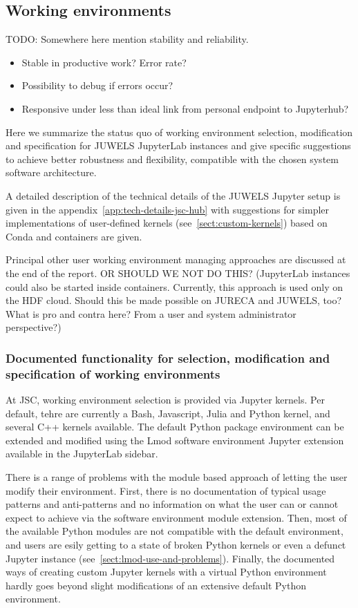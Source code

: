 
\subsection{Working environments}

TODO: Somewhere here mention stability and reliability.
\begin{itemize}
	\item Stable in productive work? Error rate?
  \item Possibility to debug if errors occur?
  \item Responsive under less than ideal link from personal endpoint to Jupyterhub?
\end{itemize}

Here we summarize the status quo of working environment selection, modification and specification for JUWELS JupyterLab instances and give specific suggestions to achieve better robustness and flexibility, compatible with the chosen system software architecture.

A detailed description of the technical details of the JUWELS Jupyter setup is given in the appendix~\ref{app:tech-details-jsc-hub} with suggestions for simpler implementations of user-defined kernels (see~\ref{sect:custom-kernels}) based on Conda and containers are given.

Principal other user working environment managing approaches are discussed at the end of the report. OR SHOULD WE NOT DO THIS? (JupyterLab instances could also be started inside containers. Currently, this approach is used only on the HDF cloud. Should this be made possible on JURECA and JUWELS, too? What is pro and contra here? From a user and system administrator perspective?)

\subsubsection{Documented functionality for selection, modification and specification of working environments}

At JSC, working environment selection is provided via Jupyter kernels.
Per default, tehre are currently a Bash, Javascript, Julia and Python kernel, and several C++ kernels available.
The default Python package environment can be extended and modified using the Lmod software environment Jupyter extension available in the JupyterLab sidebar.

There is a range of problems with the module based approach of letting the user modify their environment.
First, there is no documentation of typical usage patterns and anti-patterns and no information on what the user can or cannot expect to achieve via the software environment module extension.
Then, most of the available Python modules are not compatible with the default environment, and users are esily getting to a state of broken Python kernels or even a defunct Jupyter instance (see~\ref{sect:lmod-use-and-problems}).
Finally, the documented ways of creating custom Jupyter kernels with a virtual Python environment hardly goes beyond slight modifications of an extensive default Python environment.

